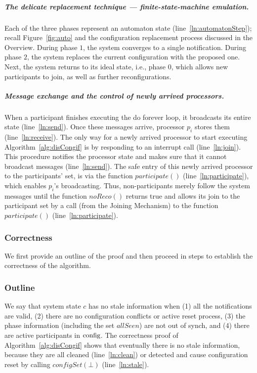 \documentclass[11pt]{article}
\newcommand{\noReconfig}{noReco}
\begin{document}
\subparagraph{The delicate replacement technique --- finite-state-machine emulation.}
Each of the three phases represent an automaton state (line~\ref{ln:automatonStep}); recall Figure~\ref{fig:auto} and the configuration replacement process discussed
in the Overview.  
During phase $1$, the system converges to a single notification. During phase $2$, the system replaces the current configuration with the proposed one. Next, the system returns to its ideal state, i.e., phase $0$, which allows new participants to join, as well as further reconfigurations.


\subparagraph{Message exchange and the control of newly arrived processors.}
When a participant finishes executing the do forever loop, it broadcasts its entire state (line~\ref{ln:send}). Once these messages arrive, processor $p_i$ stores them (line~\ref{ln:receive}). The only way for a newly arrived processor to start executing Algorithm~\ref{alg:disCongif} is by responding to an interrupt call (line~\ref{ln:join}). This procedure notifies the processor state and makes sure that it cannot broadcast messages (line~\ref{ln:send}). The safe entry of this newly arrived processor to the participants' set, is via the function $participate()$ (line~\ref{ln:participate}), which enables $p_i$'s broadcasting. Thus, non-participants merely follow the system messages until the function $\noReconfig()$ returns true and allows its join to the participant set by a call (from the Joining Mechanism) to the function $participate()$ (line~\ref{ln:participate}).




\subsubsection{Correctness}
\label{sec:recSAproof}

We first provide an outline of the proof and then proceed in steps to establish the correctness of the algorithm.
\subsubsection*{Outline} 
We say that system state $c$ has no stale information when (1) all the notifications are valid, (2) there are no configuration  conflicts or active reset process, (3) the phase information (including the set $allSeen$) are not out of synch, and (4) there are active participants  in $\textnormal{config}$. The correctness proof of Algorithm~\ref{alg:disCongif} shows that eventually there is no stale information, because they are all cleaned (line~\ref{ln:clean}) or detected and cause configuration reset by calling $configSet(\bot)$ (line~\ref{ln:stale}).
\end{document}
